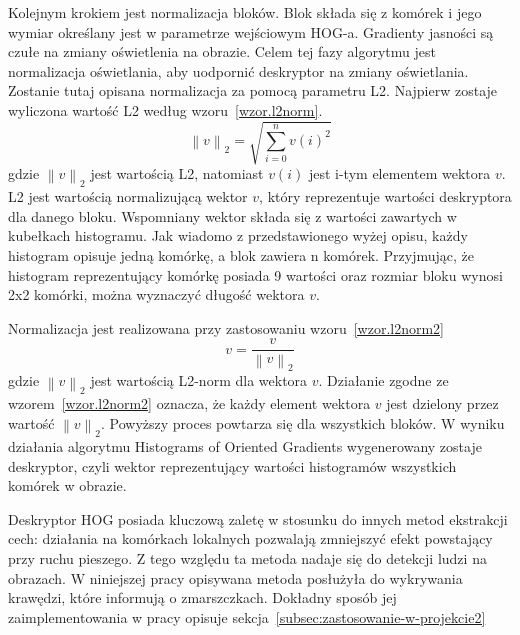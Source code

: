 \documentclass[a4paper,twoside,12pt]{book}
\begin{document}
    Kolejnym krokiem jest normalizacja bloków. Blok składa się z komórek i jego wymiar określany jest w parametrze
    wejściowym HOG-a.
    Gradienty jasności są czułe na zmiany oświetlenia na obrazie. Celem tej fazy algorytmu jest normalizacja oświetlania,
    aby uodpornić deskryptor na zmiany oświetlania.
    Zostanie tutaj opisana normalizacja za pomocą parametru L2.
    Najpierw zostaje wyliczona wartość L2 według wzoru~\ref{wzor.l2norm}.
    \large
    \begin{equation}
        \left \|v  \right \|_{2}=\sqrt{\sum_{i=0}^{n}v(i)^{2}}
        \label{wzor.l2norm}
    \end{equation}
    \normalsize
    gdzie $\left \|v  \right \|_{2}$ jest wartością L2, natomiast $v(i)$ jest i-tym elementem wektora $v$.
    L2 jest wartością normalizującą wektor $v$, który reprezentuje
    wartości
    deskryptora dla danego bloku. Wspomniany wektor składa się z wartości zawartych w kubełkach histogramu. Jak
    wiadomo z
    przedstawionego wyżej opisu, każdy histogram opisuje jedną komórkę, a blok zawiera n komórek.
    Przyjmując, że histogram reprezentujący komórkę posiada 9 wartości oraz rozmiar bloku
    wynosi 2x2 komórki, można wyznaczyć długość wektora $v$.  %

    Normalizacja jest realizowana przy zastosowaniu wzoru~\ref{wzor.l2norm2} %
    \large
    \begin{equation}
        v = \frac{v}{\left \|v  \right \|_{2}}
        \label{wzor.l2norm2}
    \end{equation}
    \normalsize
    gdzie $\left \|v  \right \|_{2}$ jest wartością L2-norm dla wektora $v$. Działanie zgodne ze
    wzorem~\ref{wzor.l2norm2} oznacza, że każdy element wektora $v$ jest dzielony przez wartość
    $\left \|v  \right\|_{2}$.
    Powyższy proces powtarza się dla wszystkich bloków.
    W wyniku działania algorytmu Histograms of Oriented Gradients wygenerowany zostaje deskryptor, czyli wektor
    reprezentujący wartości histogramów wszystkich komórek w obrazie.

    Deskryptor HOG posiada kluczową zaletę w stosunku do innych metod ekstrakcji cech:
    działania na komórkach lokalnych pozwalają zmniejszyć efekt powstający przy ruchu pieszego.
    Z tego względu ta metoda nadaje się do detekcji ludzi na obrazach.
    W niniejszej pracy opisywana metoda posłużyła do wykrywania krawędzi, które informują o zmarszczkach.
    Dokładny sposób jej
    zaimplementowania w pracy opisuje sekcja~\ref{subsec:zastosowanie-w-projekcie2}
\end{document}
